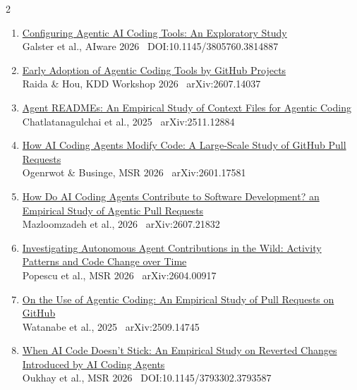 \documentclass[a4paper,10pt]{article}
\begin{document}
\begin{multicols}{2}
\begin{enumerate}[leftmargin=1.6em, topsep=2pt, itemsep=3.5pt, parsep=0pt]
\item \href{https://doi.org/10.1145/3805760.3814887}%
  {Configuring Agentic AI Coding Tools: An Exploratory Study}\\
  {\scriptsize Galster et al., AIware 2026 \textbar\ DOI:10.1145/3805760.3814887}

\item \href{https://arxiv.org/abs/2607.14037}%
  {Early Adoption of Agentic Coding Tools by GitHub Projects}\\
  {\scriptsize Raida \& Hou, KDD Workshop 2026 \textbar\ arXiv:2607.14037}

\item \href{https://arxiv.org/abs/2511.12884}%
  {Agent READMEs: An Empirical Study of Context Files for
Agentic Coding}\\
  {\scriptsize Chatlatanagulchai et al., 2025 \textbar\ arXiv:2511.12884}

\item \href{https://arxiv.org/abs/2601.17581}%
  {How AI Coding Agents Modify Code: A Large-Scale Study of GitHub Pull Requests}\\
  {\scriptsize Ogenrwot \& Businge, MSR 2026 \textbar\ arXiv:2601.17581}

\item \href{https://arxiv.org/abs/2607.21832}%
  {How Do AI Coding Agents Contribute to Software Development? an Empirical Study of Agentic Pull Requests}\\
  {\scriptsize Mazloomzadeh et al., 2026 \textbar\ arXiv:2607.21832}

\item \href{https://arxiv.org/abs/2604.00917}%
  {Investigating Autonomous Agent Contributions in the Wild: Activity Patterns and Code Change over Time}\\
  {\scriptsize Popescu et al., MSR 2026 \textbar\ arXiv:2604.00917}

\item \href{https://arxiv.org/abs/2509.14745}%
  {On the Use of Agentic Coding: An Empirical Study of Pull Requests on GitHub}\\
  {\scriptsize Watanabe et al., 2025 \textbar\ arXiv:2509.14745}

\item \href{https://doi.org/10.1145/3793302.3793587}%
  {When AI Code Doesn’t Stick: An Empirical Study on Reverted Changes Introduced by AI Coding Agents}\\
  {\scriptsize Oukhay et al., MSR 2026 \textbar\ DOI:10.1145/3793302.3793587}


\end{enumerate}
\end{multicols}
\end{document}
